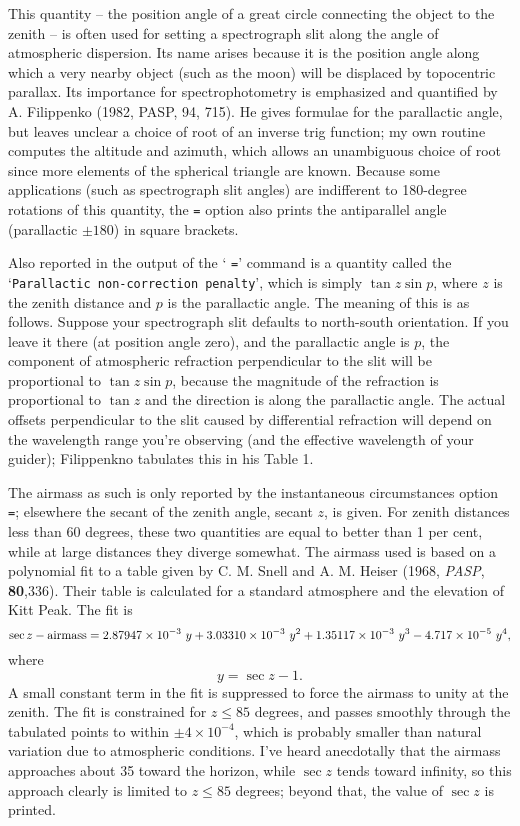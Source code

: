 \par
This quantity -- the position angle of a great circle connecting the
object to the zenith -- is often used for setting a spectrograph
slit along the angle of atmospheric dispersion.  Its name arises because
it is the position angle along which a very nearby object (such as the
moon) will be displaced by topocentric parallax.  Its importance for
spectrophotometry is emphasized and quantified
by A. Filippenko (1982, PASP, 94, 715).  He gives formulae 
for the parallactic angle, but leaves unclear a 
choice of root of an inverse trig function; my own routine 
computes the altitude and azimuth, which allows an unambiguous choice 
of root since more elements of the spherical triangle are known.
Because some applications (such as spectrograph slit angles) are 
indifferent to 180-degree rotations of this quantity, the {\tt =} option
also prints the antiparallel angle (parallactic $\pm 180$) in square brackets.

Also reported in the output of the ` {\tt =}' command is a quantity 
called the `{\tt Parallactic non-correction penalty}', which is
simply $\tan z \sin p$, where $z$ is the zenith distance and $p$ is
the parallactic angle.  The meaning of this is as follows.  Suppose
your spectrograph slit defaults to north-south orientation.  If 
you leave it there (at position angle zero), and the parallactic
angle is $p$, the component of atmospheric refraction perpendicular
to the slit will be proportional to $\tan z \sin p$, because the
magnitude of the refraction is proportional to $\tan z$ and the 
direction is along the parallactic angle.  The actual offsets perpendicular
to the slit caused by differential refraction will depend on the
wavelength range you're observing (and the effective wavelength of
your guider); Filippenkno tabulates this in his Table 1.
\par
{}
\par
The airmass as such is only reported by the instantaneous circumstances
option {\tt =}; elsewhere the secant of the zenith angle, secant $z$,
is given.  For zenith distances less than 60 degrees, these two quantities
are equal to better than 1 per cent, while at large distances they
diverge somewhat.  The airmass used is based on a polynomial fit to 
a table given by C. M. Snell and A. M. Heiser (1968, {\it PASP}, {\bf 80},336).
Their table is calculated for a standard atmosphere and the elevation
of Kitt Peak.  The fit is
$$\sec z - \hbox{airmass} = 2.87947 \times 10^{-3}\ y +  3.03310 \times 10^{-3}\ y^2 + 1.35117 \times 10^{-3}\ y^3 - 4.717 \times 10^{-5}\ y^4, $$
where
$$ y = \sec z - 1.$$
A small constant term in the fit is suppressed to force the airmass to 
unity at the zenith.  The fit is constrained for $z \le 85$ degrees, and
passes smoothly through the tabulated points to within $\pm 4 \times 10^{-4}$, 
which is probably smaller than natural variation due to atmospheric
conditions.  I've heard anecdotally that the airmass approaches about
35 toward the horizon, while $\sec z$ tends toward infinity, so this
approach clearly is limited to $z \le 85$ degrees; beyond that, 
the value of $\sec z$ is printed.
\par
{}

